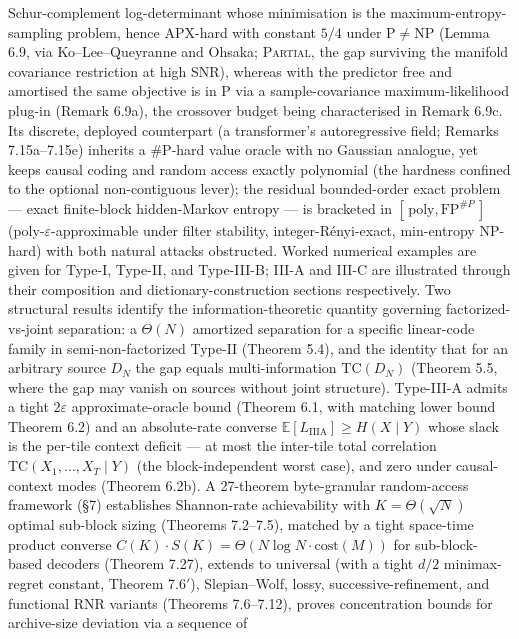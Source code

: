 \documentclass[
]{article}
\begin{document}
Schur-complement log-determinant whose minimisation is the
maximum-entropy-sampling problem, hence APX-hard with constant $5/4$
under $\mathrm{P} \neq \mathrm{NP}$ (Lemma 6.9, via Ko--Lee--Queyranne
and Ohsaka; \textsc{Partial}, the gap surviving the manifold
covariance restriction at high SNR), whereas with the predictor free
and amortised the same objective is in $\mathrm{P}$ via a
sample-covariance maximum-likelihood plug-in (Remark 6.9a), the
crossover budget being characterised in Remark 6.9c. Its discrete, deployed
counterpart (a transformer's autoregressive field; Remarks 7.15a--7.15e)
inherits a \#P-hard value oracle with no Gaussian analogue, yet keeps causal
coding and random access exactly polynomial (the hardness confined to the
optional non-contiguous lever); the residual bounded-order exact problem ---
exact finite-block hidden-Markov entropy --- is bracketed in
$[\,\text{poly},\mathrm{FP}^{\#P}\,]$ (poly-$\varepsilon$-approximable under
filter stability, integer-R\'enyi-exact, min-entropy NP-hard) with both natural
attacks obstructed. Worked numerical examples are
given for Type-I, Type-II, and Type-III-B; III-A and III-C are
illustrated through their composition and dictionary-construction
sections respectively. Two structural results identify the
information-theoretic quantity governing factorized-vs-joint
separation: a $\Theta(N)$ amortized separation for a specific
linear-code family in semi-non-factorized Type-II (Theorem 5.4), and
the identity that for an arbitrary source $D_N$ the gap equals
multi-information $\mathrm{TC}(D_N)$ (Theorem 5.5, where the gap may
vanish on sources without joint structure). Type-III-A admits a tight
$2\varepsilon$ approximate-oracle bound (Theorem 6.1, with matching
lower bound Theorem 6.2) and an absolute-rate converse
$\mathbb{E}[L_{\mathrm{IIIA}}]\ge H(X\mid Y)$ whose slack is the
per-tile context deficit --- at most the inter-tile total correlation
$\mathrm{TC}(X_1,\ldots,X_T\mid Y)$ (the block-independent worst case),
and zero under causal-context modes (Theorem 6.2b). A 27-theorem
byte-granular random-access
framework (§7) establishes Shannon-rate achievability with
$K = \Theta(\sqrt{N})$ optimal sub-block sizing (Theorems 7.2--7.5),
matched by a tight space-time product converse $C(K) \cdot S(K) =
\Theta(N \log N \cdot \mathrm{cost}(M))$ for sub-block-based
decoders (Theorem 7.27),
extends to universal (with a tight $d/2$ minimax-regret constant,
Theorem 7.6$'$), Slepian--Wolf, lossy, successive-refinement,
and functional RNR variants (Theorems 7.6--7.12), proves
concentration bounds for archive-size deviation via a sequence of
\end{document}
